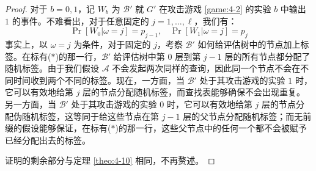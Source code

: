 \begin{proof}
对于 $b=0,1$，记 $W_b$ 为 $\mathcal{B}'$ 就 $G'$ 在攻击游戏 \ref{game:4-2} 的实验 $b$ 中输出 $1$ 的事件。不难看出，对于任意固定的 $j=1,\dots,\ell$，我们有：
\[
\Pr[W_0|\omega=j]=p_{j-1},~~~~
\Pr[W_1|\omega=j]=p_j
\]
事实上，以 $\omega=j$ 为条件，对于固定的 $j$，考察 $\mathcal{B}'$ 如何给评估树中的节点加上标签。在标有($*$)的那一行，$\mathcal{B}'$ 给评估树中第 $0$ 层到第 $j-1$ 层的所有节点都分配了随机标签。由于我们假设 $\mathcal{A}$ 不会发起两次同样的查询，因此同一个节点不会在不同时间收到两个不同的标签。现在，一方面，当 $\mathcal{B}'$ 处于其攻击游戏的实验 $1$ 时，它可以有效地给第 $j$ 层的节点分配随机标签，而查找表能够确保不会出现重复。另一方面，当 $\mathcal{B}'$ 处于其攻击游戏的实验 $0$ 时，它可以有效地给第 $j$ 层的节点分配伪随机标签，这等同于给这些节点在第 $j-1$ 层的父节点分配随机标签；而无前缀的假设能够保证，在标有($*$)的那一行，这些父节点中的任何一个都不会被赋予已经分配出去的标签。

证明的剩余部分与定理 \ref{theo:4-10} 相同，不再赘述。
\end{proof}